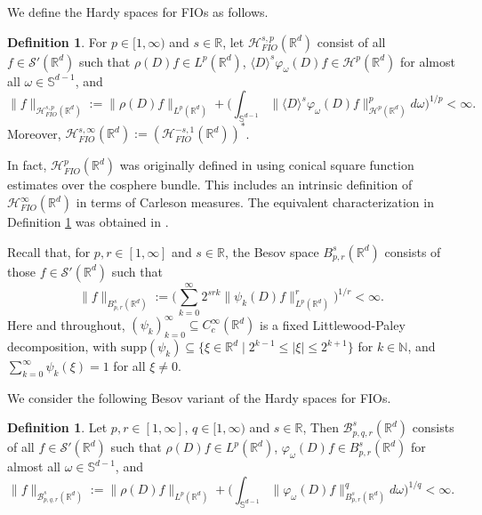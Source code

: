 \documentclass{amsart}
\theoremstyle{definition}
\newtheorem{definition}[theorem]{Definition}
\newcommand{\R}{\mathbb{R}}
\newcommand{\N}{\mathbb{N}}
\newcommand {\Rd}{\mathbb{R}^{d}}
\newcommand {\Hp}{\mathcal{H}^{p}_{FIO}(\Rd)}
\newcommand {\Hps}{\mathcal{H}^{s,p}_{FIO}(\Rd)}
\newcommand {\HT}{\mathcal{H}}
\newcommand {\Bspq}{B^{s}_{p,r}(\Rd)}
\newcommand {\Baspqr}{\mathcal{B}^{s}_{p,q,r}(\Rd)}
\newcommand {\supp}{\mathrm{supp}}
\newcommand {\Sw}{\mathcal{S}}
\numberwithin{equation}{section}
\begin{document}
We define the Hardy spaces for FIOs as follows.

\begin{definition}\label{def:HpFIO}
For $p \in [1,\infty)$ and $s\in\R$, let $\Hps$ consist of all $f \in \mathcal{S}'(\R^d)$ such that $\rho(D) f \in L^p(\Rd)$, $\langle D \rangle^s \varphi_\omega(D) f \in \mathcal{H}^{p}(\R^d)$ for almost all $\omega \in \mathbb{S}^{d-1}$, and
\begin{equation*}
\| f \|_{\Hps} := \| \rho(D) f \|_{L^p(\R^d)} + \Big( \int_{\mathbb{S}^{d-1}} \| \langle D \rangle^s \varphi_\omega(D) f \|^p_{\mathcal{H}^p(\R^d)} d\omega \Big)^{1/p} < \infty.
\end{equation*}
Moreover, $\HT^{s,\infty}_{FIO}(\Rd):=(\HT^{-s,1}_{FIO}(\Rd))^{*}$.
\end{definition}

In fact, $\Hp$ was originally defined in \cite{Smith1998,HassellPortalRozendaal2020} using conical square function estimates over the cosphere bundle. This includes an intrinsic definition of $\HT^{\infty}_{FIO}(\Rd)$ in terms of Carleson measures. The equivalent characterization in Definition \ref{def:HpFIO} was obtained in \cite{FaLiRoSo19,Rozendaal2021}.

Recall that, for $p,r\in[1,\infty]$ and $s\in\R$, the Besov space $\Bspq$ consists of those $f\in\Sw'(\Rd)$ such that
\[
\|f\|_{\Bspq}:=\Big(\sum_{k=0}^{\infty}2^{srk}\|\psi_{k}(D)f\|_{L^{p}(\Rd)}^{r}\Big)^{1/r}<\infty.
\]
Here and throughout,  $(\psi_{k})_{k=0}^{\infty}\subseteq C^{\infty}_{c}(\Rd)$ is a fixed Littlewood-Paley decomposition, with $\supp(\psi_{k})\subseteq \{\xi\in\Rd\mid 2^{k-1}\leq |\xi|\leq 2^{k+1}\}$ for $k\in\N$, and $\sum_{k=0}^{\infty}\psi_{k}(\xi)=1$ for all $\xi\neq 0$. 

We consider the following Besov variant of the Hardy spaces for FIOs.

\begin{definition}\label{def:Besov}
Let $p,r\in[1,\infty]$, $q\in [1,\infty)$ and $s\in\R$, Then $\Baspqr$ consists of all $f \in \mathcal{S}'(\R^d)$ such that $\rho(D) f \in L^p(\Rd)$, $ \varphi_\omega(D) f \in \Bspq$ for almost all $\omega \in \mathbb{S}^{d-1}$, and
\[
\| f \|_{\Baspqr} := \| \rho(D) f \|_{L^p(\R^d)} + \Big( \int_{\mathbb{S}^{d-1}} \|\varphi_\omega(D) f \|^q_{B^{s}_{p,r}(\Rd)} d\omega \Big)^{1/q} < \infty.
\]
\end{definition}
\end{document}
